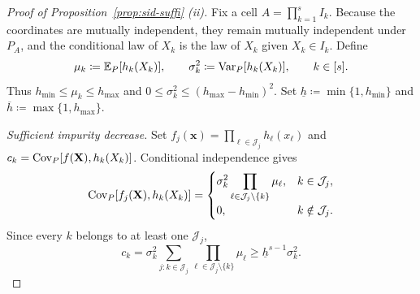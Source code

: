 \documentclass[11pt]{article}
\theoremstyle{plain}
\theoremstyle{definition}
\theoremstyle{remark}
\theoremstyle{plain}
\newcommand{\bx}{\mathbf{x}}
\newcommand{\bX}{\mathbf{X}}
\DeclarePairedDelimiter{\bracks}{[}{]}
\newcommand{\E}{\mathbb{E}}
\newcommand{\Var}{\textnormal{Var}}
\newcommand{\Cov}{\textnormal{Cov}}
\newcommand{\1}{\mathbbm{1}}
\begin{document}
\begin{proof}[Proof of Proposition~\ref{prop:sid-suffi} (ii)]
    Fix a cell $A=\prod_{k=1}^s I_k$. Because the coordinates are
    mutually independent, they remain mutually independent under $P_A$, and
    the conditional law of $X_k$ is the law of $X_k$ given $X_k\in I_k$.
    Define
    \begin{equation}\label{eq:mean-sigma}
      \mu_k \coloneqq \E_P\bracks*{h_k(X_k)}, \qquad
      \sigma_k^2 \coloneqq \Var_P[h_k(X_k)], \qquad k\in[s].
    \end{equation}
    Thus $h_{\min}\leq\mu_k\leq h_{\max}$ and
    $0\leq\sigma_k^2\leq(h_{\max}-h_{\min})^2$.
    Set $\underline h\coloneqq\min\{1,h_{\min}\}$ and
    $\overline h\coloneqq\max\{1,h_{\max}\}$.

    \textit{Sufficient impurity decrease.}
    Set $f_j(\bx)=\prod_{\ell\in\mathcal J_j}h_\ell(x_\ell)$ and
    $c_k=\Cov_P[f(\bX),h_k(X_k)]$. Conditional independence gives
    \begin{equation}\label{eq:cov-products-P}
      \Cov_P[f_j(\bX),h_k(X_k)]
      =
      \begin{cases}
        \displaystyle \sigma_k^2
        \prod_{\ell\in\mathcal J_j\setminus\{k\}}\mu_\ell,
        & k\in\mathcal J_j,\\[6pt]
        0, & k\notin\mathcal J_j.
      \end{cases}
    \end{equation}
    Since every $k$ belongs to at least one $\mathcal J_j$,
    \begin{equation}\label{eq:cov-products-lower}
      c_k
      =\sigma_k^2\sum_{j:k\in\mathcal J_j}
        \prod_{\ell\in\mathcal J_j\setminus\{k\}}\mu_\ell
      \geq \underline h^{s-1}\sigma_k^2.
    \end{equation}


\end{proof}
\end{document}
